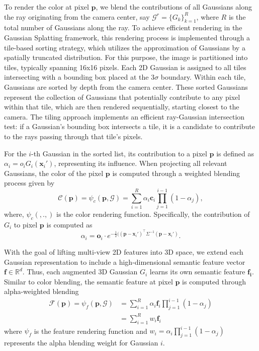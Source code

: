 To render the color at pixel $\mathbf{p}$, we blend the contributions of all Gaussians along the ray originating from the camera center, say $\mathcal{G}^r = \{G_k\}_{k=1}^R$, where $R$ is the total number of Gaussians along the ray. To achieve efficient rendering in the Gaussian Splatting framework, this rendering process is implemented through a tile-based sorting strategy, which utilizes the approximation of Gaussians by a spatially truncated distribution. For this purpose, the image is partitioned into tiles, typically spanning 16x16 pixels. Each 2D Gaussian is assigned to all tiles intersecting with a bounding box placed at the 3$\sigma$ boundary. Within each tile, Gaussians are sorted by depth from the camera center. These sorted Gaussians represent the collection of Gaussians that potentially contribute to any pixel within that tile, which are then rendered sequentially, starting closest to the camera. The tiling approach implements an efficient ray-Gaussian intersection test: if a Gaussian's bounding box intersects a tile, it is a candidate to contribute to the rays passing through that tile's pixels.

For the \(i\)-th Gaussian in the sorted list, its contribution to a pixel $\mathbf{p}$ is defined as $\alpha_i = o_i G_i(\mathbf{x}_i')$, representing its influence. When projecting all relevant Gaussians, the color of the pixel $\mathbf{p}$ is computed through a weighted blending process given by
\begin{equation}
 \mathcal{C}(\mathbf{p}) = \psi_c (\mathbf{p}, \mathcal{G}) = \sum_{i=1}^{R} \alpha_i \mathbf{c}_i \prod_{j=1}^{i-1} (1 - \alpha_j),
 \label{eq:colorR}
\end{equation}
where, $\psi_c(,.,)$ is the color rendering function. Specifically, the contribution of $G_i$ to pixel $\mathbf{p}$ is computed as
\begin{equation}
    \alpha_i = \mathbf{o}_i \cdot e^{-\frac{1}{2}((\mathbf{p} - \mathbf x_i ')^{\intercal}\Sigma^{-1}(\mathbf{p} - \mathbf x_i ')}.
    \label{eq:featureR}
\end{equation}


With the goal of lifting multi-view 2D features into 3D space, we extend each Gaussian representation to include a high-dimensional semantic feature vector $\mathbf{f} \in \mathbb{R}^{d}$. Thus, each augmented 3D Gaussian $G_i$ learns its own semantic feature $\mathbf{f_i}$. Similar to color blending, the semantic feature at pixel $\mathbf{p}$ is computed through alpha-weighted blending
\begin{align}
\mathcal{F}(\mathbf{p}) = \psi_f (\mathbf{p}, \mathcal{G}) & = \sum_{i=1}^{R} \alpha_i \mathbf{f}_i\prod_{j=1}^{i-1} (1 - \alpha_j) \\
&= \sum_{i=1}^{R} w_i \mathbf{f}_i  
\label{eq:featureR}
\end{align}
where $\psi_f$ is the feature rendering function and $w_i = \alpha_i\prod_{j=1}^{i-1} (1 - \alpha_j)$ represents the alpha blending weight for Gaussian $i$. 

